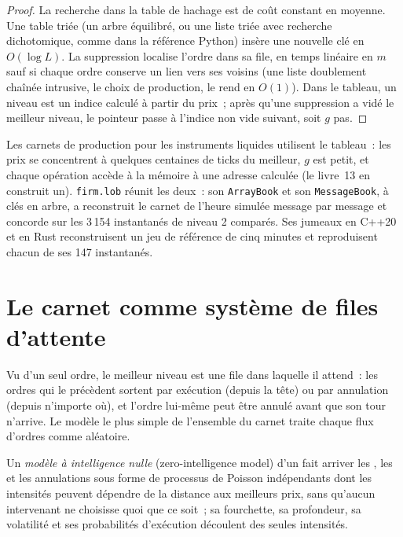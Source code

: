 \begin{proof}
La recherche dans la table de hachage est de coût constant en moyenne. Une table triée (un arbre équilibré, ou une liste triée avec recherche dichotomique, comme dans la référence Python) insère une nouvelle clé
en $O(\log L)$. La suppression localise l'ordre dans sa file, en temps linéaire en $m$ sauf si chaque ordre conserve un lien vers ses voisins (une liste doublement chaînée intrusive,
le choix de production, le rend en $O(1)$). Dans le tableau, un niveau est un indice calculé à partir du prix~; après qu'une suppression a vidé le meilleur niveau, le
pointeur passe à l'indice non vide suivant, soit $g$ pas.
\end{proof}

Les carnets de production pour les instruments liquides utilisent le tableau~: les prix se concentrent à quelques centaines de ticks du meilleur, $g$ est petit, et chaque
opération accède à la mémoire à une adresse calculée (le livre~13 en construit un). \texttt{firm.lob} réunit les deux~: son \texttt{ArrayBook} et son
\texttt{MessageBook}, à clés en arbre, a reconstruit le carnet de l'heure simulée message par message et concorde sur les 3\,154 instantanés de niveau 2 comparés.
Ses jumeaux en C++20 et en Rust reconstruisent un jeu de référence de cinq minutes et reproduisent chacun de ses 147 instantanés.

\section{Le carnet comme système de files d'attente}

Vu d'un seul ordre, le meilleur niveau est une file dans laquelle il attend~: les ordres qui le précèdent sortent par exécution (depuis la tête) ou par annulation (depuis
n'importe où), et l'ordre lui-même peut être annulé avant que son tour n'arrive. Le modèle le plus simple de l'ensemble du carnet traite chaque flux d'ordres comme aléatoire.

\begin{definition}\label{def:mx:the-limit-order-book:zi}
Un \emph{modèle à intelligence nulle} (zero-intelligence model) d'un  fait arriver les , les  et les annulations
sous forme de processus de Poisson indépendants dont les intensités peuvent dépendre de la distance aux meilleurs prix, sans qu'aucun intervenant ne choisisse quoi que ce soit~; sa fourchette,
sa profondeur, sa volatilité et ses probabilités d'exécution découlent des seules intensités.
\end{definition}


